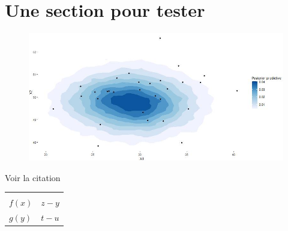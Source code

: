   \section{Une section pour tester}

\begin{figure}[h!]
  \begin{center}
      \includegraphics[scale=0.4]{density-predictive-full-X.jpeg}
  \end{center}
  \end{figure}

  Voir la citation \cite{pearl2019}

  \begin{table}[h!]
\begin{tabular}{|l|l|}
\hline \\
$f(x)$ & $z-y$ \\
$g(y)$ & $t-u$ \\
\hline
\end{tabular}
  \end{table}